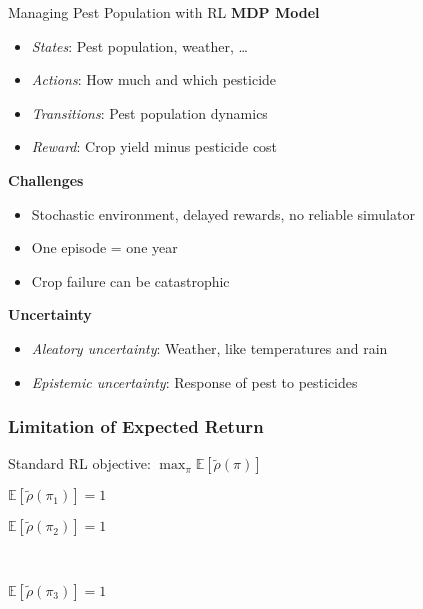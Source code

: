 \documentclass{beamer}
\begin{document}
\begin{frame}{Managing Pest Population with RL}
\textbf{MDP Model}
    \begin{itemize}
    \item \emph{States}: Pest population, weather, \ldots
    \item \emph{Actions}: How much and which pesticide 
    \item \emph{Transitions}: Pest population dynamics
    \item \emph{Reward}:  Crop yield minus pesticide cost
    \end{itemize}
\vfill
\textbf{Challenges}
    \begin{itemize}
    \item Stochastic environment, delayed rewards, no reliable simulator
    \item One episode = one year
    \item Crop failure can be catastrophic
    \end{itemize}
\vfill
\textbf{Uncertainty}
\begin{itemize}
\item \emph{Aleatory uncertainty}: Weather, like temperatures and rain
\item \emph{Epistemic uncertainty}: Response of pest to pesticides
\end{itemize}
\end{frame}

\begin{frame} \frametitle{Limitation of Expected Return}
  Standard RL objective: $\max_{\pi} \mathbb{E}[\tilde{\rho}(\pi)]$

  \begin{center}
  \begin{minipage}{0.42\linewidth}
    \centering
    $ \mathbb{E}[\tilde{\rho}(\pi_1)] = 1$
  \end{minipage}
  \hspace{0.05\linewidth}
  \begin{minipage}{0.42\linewidth}
    \centering
    $ \mathbb{E}[\tilde{\rho}(\pi_2)] = 1$
  \end{minipage}
  \\[0.3cm]
  \begin{minipage}{0.42\linewidth}
    \centering
    $ \mathbb{E}[\tilde{\rho}(\pi_3)] = 1$
  \end{minipage}
  \end{center}
\end{frame}
\end{document}
